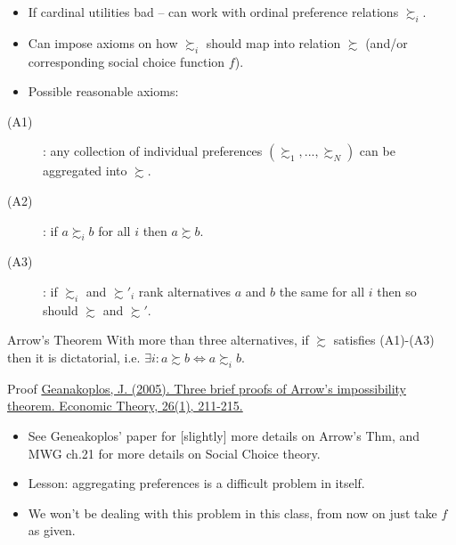 \documentclass[english]{beamer}		%
\def\lyxframeend{} %
\begin{document}
\begin{itemize}
	\item If cardinal utilities bad -- can work with ordinal preference relations $\succsim_i$.
	\item Can impose axioms on how  $\succsim_i$ should map into  relation $\succsim$ (and/or corresponding social choice function $f$).
	\pause
	\item Possible reasonable axioms:
\end{itemize}
\begin{description}
	\item[(A1)] : any collection of individual preferences $\left(\succsim_1, ..., \succsim_N \right)$ can be aggregated into $\succsim$.
	\item[(A2)] : if $a \succsim_i b$ for all $i$ then $a \succsim b$.
	\item[(A3)] : if $\succsim_i$ and $\succsim'_i$ rank alternatives $a$ and $b$ the same for all $i$ then so should $\succsim$ and $\succsim'$.
\end{description}
\lyxframeend


\begin{block}{Arrow's Theorem}
	With more than three alternatives, if $\succsim$ satisfies (A1)-(A3) then it is dictatorial, i.e. $\exists i: a \succsim b \Leftrightarrow a \succsim_i b$.
\end{block}
\begin{block}{Proof}
	\pause \href{https://link.springer.com/article/10.1007/s00199-004-0556-7}{Geanakoplos, J. (2005). Three brief proofs of Arrow's impossibility theorem. Economic Theory, 26(1), 211-215.}
	\vspace{9em}
\end{block}
\vspace{-2em}
\lyxframeend


\begin{itemize}
	\item See Geneakoplos' paper for [slightly] more details on Arrow's Thm, and MWG ch.21 for more details on Social Choice theory.
	\item Lesson: aggregating preferences is a difficult problem in itself.
	\item We won't be dealing with this problem in this class, from now on just take $f$ as given.
\end{itemize}
\lyxframeend
\end{document}
